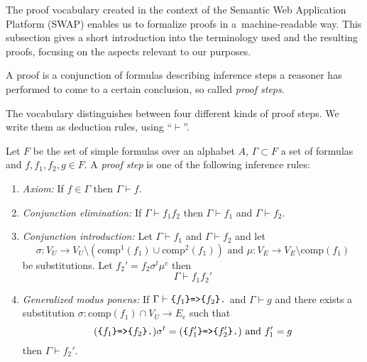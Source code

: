 The \nthree proof vocabulary created in the context of the Semantic Web Application Platform (SWAP) \cite{SWAP} enables us to formalize proofs in a~machine-readable way.
This subsection gives a short introduction into the terminology used and the resulting proofs,
focusing on the aspects relevant to our purposes.

A proof is a conjunction of \nthree formulas describing 
inference steps
a reasoner has performed to come to a certain conclusion, so called \textit{proof steps}. 




The vocabulary distinguishes between four different kinds of proof steps. We write them as deduction rules, using ``$\vdash$''.

\begin{definition}\label{proofsteps}
Let $F$ be the set of simple formulas over an \nthree alphabet $A$, $\Gamma\subset F$ a set of formulas and
$f,f_1,f_2, g\in F$. 
A \textit{proof step} is one of the following inference rules:
\begin{enumerate}
 \item \emph{Axiom:} If $f \in \Gamma$ then $\Gamma \vdash f$.%
 \item \emph{Conjunction elimination:} If $\Gamma \vdash f_1f_2$ then $\Gamma \vdash f_1$ and $\Gamma \vdash f_2$.
 \item \emph{Conjunction introduction:} Let $\Gamma\vdash f_1$ and $\Gamma \vdash f_2$ and 
 let \[\sigma: V_U\rightarrow V_U\setminus(\text{comp}^1(f_1)\cup\text{comp}^2(f_1)) 
 \text{ and } %
 \mu:V_E\rightarrow V_E\setminus \text{comp}(f_1)\] be substitutions. Let $f_2'= f_2\sigma^t\mu^c$ 
then \[\Gamma \vdash f_1f_2'\]
 \item \emph{Generalized modus ponens:} If $\Gamma \vdash \verb!{!f_1\verb!}=>{!f_2\verb!}.!$ and $\Gamma \vdash g$ %
 and there exists a substitution $\sigma:\text{comp}(f_1)\cap V_U \rightarrow E_e$ such that 
 \[
  (\verb!{!f_1\verb!}=>{!f_2\verb!}.!)\sigma^t= (\verb!{!f_1'\verb!}=>{!f_2'\verb!}.!)\text{ and }
 f'_1=g\] 
then $\Gamma \vdash f_2'$.
 \end{enumerate}
\end{definition}


